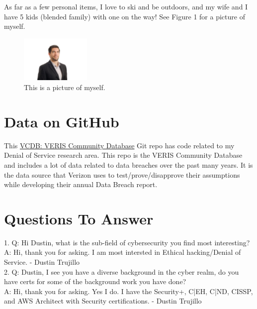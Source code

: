 As far as a few personal items, I love to ski and be outdoors, and my wife and I have 5 kids (blended family) with one on the way! See Figure 1 for a picture of myself.

\begin{figure}[h]
\centering
\includegraphics[width=0.3\textwidth]{trujillo.jpg}
\caption{\label{fig:Me}This is a picture of myself.}
\end{figure}


\section{Data on GitHub}
This \href{https://github.com/vz-risk/VCDB}{VCDB: VERIS Community Database} Git repo has code related to my Denial of Service research area. This repo is the VERIS Community Database and includes a lot of data related to data breaches over the past many years. It is the data source that Verizon uses to test/prove/disapprove their assumptions while developing their annual Data Breach report.

\section{Questions To Answer}
1. Q: Hi Dustin, what is the sub-field of cybersecurity you find most interesting?
\\
A: Hi, thank you for asking. I am most intersted in Ethical hacking/Denial of Service. - Dustin Trujillo
\\
2. Q: Dustin, I see you have a diverse background in the cyber realm, do you have certs for some of the background work you have done?
\\
A: Hi, thank you for asking. Yes I do. I have the Security+, C|EH, C|ND, CISSP, and AWS Architect with Security certifications. - Dustin Trujillo

% 
